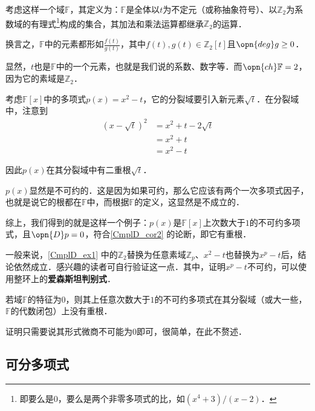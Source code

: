 \begin{example}{}\label{CmplD_ex1}

考虑这样一个域$\mathbb{F}$，其定义为：$\mathbb{F}$是全体以$t$为不定元（或称抽象符号）、以$\mathbb{Z}_2$为系数域的有理式\footnote{即要么是$0$，要么是两个非零多项式的比，如$(x^4+3)/(x-2)$．}构成的集合，其加法和乘法运算都继承$\mathbb{Z}_2$的运算．

换言之，$\mathbb{F}$中的元素都形如$\frac{f(t)}{g(t)}$，其中$f(t), g(t)\in\mathbb{Z}_2[t]$且$\opn{deg}g\geq 0$．

显然，$t$也是$\mathbb{F}$中的一个元素，也就是我们说的系数、数字等．而$\opn{ch}\mathbb{F}=2$，因为它的素域是$\mathbb{Z}_2$．

考虑$\mathbb{F}[x]$中的多项式$p(x) = x^2-t$，它的分裂域要引入新元素$\sqrt{t}$．在分裂域中，注意到
\begin{equation}
\begin{aligned}
(x-\sqrt{t})^2&=x^2+t-2\sqrt{t}\\
&=x^2+t\\
&=x^2-t
\end{aligned}
\end{equation}

因此$p(x)$在其分裂域中有二重根$\sqrt{t}$．

$p(x)$显然是不可约的．这是因为如果可约，那么它应该有两个一次多项式因子，也就是说它的根都在$\mathbb{F}$中，而根据$\mathbb{F}$的定义，这显然是不成立的．

综上，我们得到的就是这样一个例子：$p(x)$是$\mathbb{F}[x]$上次数大于$1$的不可约多项式，且$\opn{D}p=0$，符合\autoref{CmplD_cor2} 的论断，即它有重根．

\end{example}

一般来说，\autoref{CmplD_ex1} 中的$\mathbb{Z}_2$替换为任意素域$\mathbb{Z}_p$、$x^2-t$也替换为$x^p-t$后，结论依然成立．感兴趣的读者可自行验证这一点．其中，证明$x^p-t$不可约，可以使用整环上的\textbf{爱森斯坦判别式}．

\begin{corollary}{}\label{CmplD_cor3}

若域$\mathbb{F}$的特征为$0$，则其上任意次数大于$1$的不可约多项式在其分裂域（或大一些，$\mathbb{F}$的代数闭包）上没有重根．

\end{corollary}

证明只需要说其形式微商不可能为$0$即可，很简单，在此不赘述．




\subsection{可分多项式}



